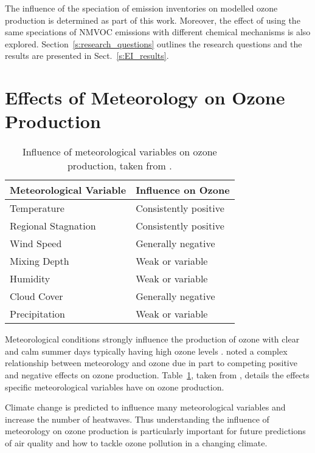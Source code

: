 The influence of the speciation of emission inventories on modelled ozone production is determined as part of this work.
Moreover, the effect of using the same speciations of NMVOC emissions with different chemical mechanisms is also explored.
Section~\ref{s:research_questions} outlines the research questions and the results are presented in Sect.~\ref{s:EI_results}.

\section{Effects of Meteorology on Ozone Production} \label{s:meteo_ozone}
\begin{table}
    \centering
    \caption[Influence of meteorological variables on ozone production]{Influence of meteorological variables on ozone production, taken from \citet{Jacob:2009}.}
    \begin{tabular}{ll}
        \hline \hline
        \textbf{Meteorological Variable} & \textbf{Influence on Ozone} \\
        \hline \hline
        Temperature & Consistently positive \\
        Regional Stagnation & Consistently positive \\
        Wind Speed & Generally negative \\
        Mixing Depth & Weak or variable \\
        Humidity & Weak or variable \\
        Cloud Cover & Generally negative \\
        Precipitation & Weak or variable \\
        \hline \hline
    \end{tabular}
    \label{t:meteo_vars}
\end{table}
Meteorological conditions strongly influence the production of ozone with clear and calm summer days typically having high ozone levels \citep{Duenas:2002}.
\citet{Comrie:1997} noted a complex relationship between meteorology and ozone due in part to competing positive and negative effects on ozone production.
Table~\ref{t:meteo_vars}, taken from \citet{Jacob:2009}, details the effects specific meteorological variables have on ozone production.

Climate change is predicted to influence many meteorological variables and increase the number of heatwaves.
Thus understanding the influence of meteorology on ozone production is particularly important for future predictions of air quality and how to tackle ozone pollution in a changing climate.


